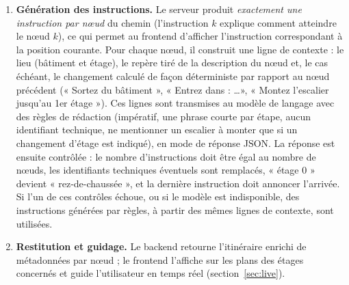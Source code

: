 \documentclass[12pt,a4paper]{report}
\begin{document}
\begin{enumerate}
  \item \textbf{Génération des instructions.} Le serveur produit \emph{exactement une instruction
  par nœud} du chemin (l'instruction $k$ explique comment atteindre le nœud $k$), ce qui permet au
  frontend d'afficher l'instruction correspondant à la position courante. Pour chaque nœud, il
  construit une ligne de contexte : le lieu (bâtiment et étage), le repère tiré de la description
  du nœud et, le cas échéant, le changement calculé de façon déterministe par rapport au nœud
  précédent (« Sortez du bâtiment », « Entrez dans : \ldots », « Montez l'escalier jusqu'au 1er
  étage »). Ces lignes sont transmises au modèle de langage avec des règles de rédaction
  (impératif, une phrase courte par étape, aucun identifiant technique, ne mentionner un escalier
  à monter que si un changement d'étage est indiqué), en mode de réponse JSON. La réponse est
  ensuite contrôlée : le nombre d'instructions doit être égal au nombre de nœuds, les identifiants
  techniques éventuels sont remplacés, « étage 0 » devient « rez-de-chaussée », et la dernière
  instruction doit annoncer l'arrivée. Si l'un de ces contrôles échoue, ou si le modèle est
  indisponible, des instructions générées par règles, à partir des mêmes lignes de contexte, sont
  utilisées.

  \item \textbf{Restitution et guidage.} Le backend retourne l'itinéraire enrichi de métadonnées
  par nœud ; le frontend l'affiche sur les plans des étages concernés et guide l'utilisateur en
  temps réel (section~\ref{sec:live}).
\end{enumerate}
\end{document}
